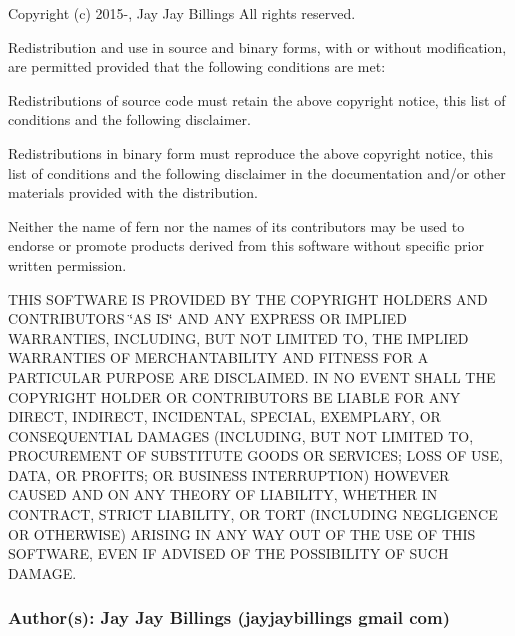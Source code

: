  Copyright (c) 2015-\/, Jay Jay Billings All rights reserved.

Redistribution and use in source and binary forms, with or without modification, are permitted provided that the following conditions are met\+:

Redistributions of source code must retain the above copyright notice, this list of conditions and the following disclaimer.

Redistributions in binary form must reproduce the above copyright notice, this list of conditions and the following disclaimer in the documentation and/or other materials provided with the distribution.

Neither the name of fern nor the names of its contributors may be used to endorse or promote products derived from this software without specific prior written permission.

T\+H\+IS S\+O\+F\+T\+W\+A\+RE IS P\+R\+O\+V\+I\+D\+ED BY T\+HE C\+O\+P\+Y\+R\+I\+G\+HT H\+O\+L\+D\+E\+RS A\+ND C\+O\+N\+T\+R\+I\+B\+U\+T\+O\+RS \char`\"{}\+A\+S I\+S\char`\"{} A\+ND A\+NY E\+X\+P\+R\+E\+SS OR I\+M\+P\+L\+I\+ED W\+A\+R\+R\+A\+N\+T\+I\+ES, I\+N\+C\+L\+U\+D\+I\+NG, B\+UT N\+OT L\+I\+M\+I\+T\+ED TO, T\+HE I\+M\+P\+L\+I\+ED W\+A\+R\+R\+A\+N\+T\+I\+ES OF M\+E\+R\+C\+H\+A\+N\+T\+A\+B\+I\+L\+I\+TY A\+ND F\+I\+T\+N\+E\+SS F\+OR A P\+A\+R\+T\+I\+C\+U\+L\+AR P\+U\+R\+P\+O\+SE A\+RE D\+I\+S\+C\+L\+A\+I\+M\+ED. IN NO E\+V\+E\+NT S\+H\+A\+LL T\+HE C\+O\+P\+Y\+R\+I\+G\+HT H\+O\+L\+D\+ER OR C\+O\+N\+T\+R\+I\+B\+U\+T\+O\+RS BE L\+I\+A\+B\+LE F\+OR A\+NY D\+I\+R\+E\+CT, I\+N\+D\+I\+R\+E\+CT, I\+N\+C\+I\+D\+E\+N\+T\+AL, S\+P\+E\+C\+I\+AL, E\+X\+E\+M\+P\+L\+A\+RY, OR C\+O\+N\+S\+E\+Q\+U\+E\+N\+T\+I\+AL D\+A\+M\+A\+G\+ES (I\+N\+C\+L\+U\+D\+I\+NG, B\+UT N\+OT L\+I\+M\+I\+T\+ED TO, P\+R\+O\+C\+U\+R\+E\+M\+E\+NT OF S\+U\+B\+S\+T\+I\+T\+U\+TE G\+O\+O\+DS OR S\+E\+R\+V\+I\+C\+ES; L\+O\+SS OF U\+SE, D\+A\+TA, OR P\+R\+O\+F\+I\+TS; OR B\+U\+S\+I\+N\+E\+SS I\+N\+T\+E\+R\+R\+U\+P\+T\+I\+ON) H\+O\+W\+E\+V\+ER C\+A\+U\+S\+ED A\+ND ON A\+NY T\+H\+E\+O\+RY OF L\+I\+A\+B\+I\+L\+I\+TY, W\+H\+E\+T\+H\+ER IN C\+O\+N\+T\+R\+A\+CT, S\+T\+R\+I\+CT L\+I\+A\+B\+I\+L\+I\+TY, OR T\+O\+RT (I\+N\+C\+L\+U\+D\+I\+NG N\+E\+G\+L\+I\+G\+E\+N\+CE OR O\+T\+H\+E\+R\+W\+I\+SE) A\+R\+I\+S\+I\+NG IN A\+NY W\+AY O\+UT OF T\+HE U\+SE OF T\+H\+IS S\+O\+F\+T\+W\+A\+RE, E\+V\+EN IF A\+D\+V\+I\+S\+ED OF T\+HE P\+O\+S\+S\+I\+B\+I\+L\+I\+TY OF S\+U\+CH D\+A\+M\+A\+GE.

\subsubsection*{Author(s)\+: Jay Jay Billings (jayjaybillings  gmail  com) }

